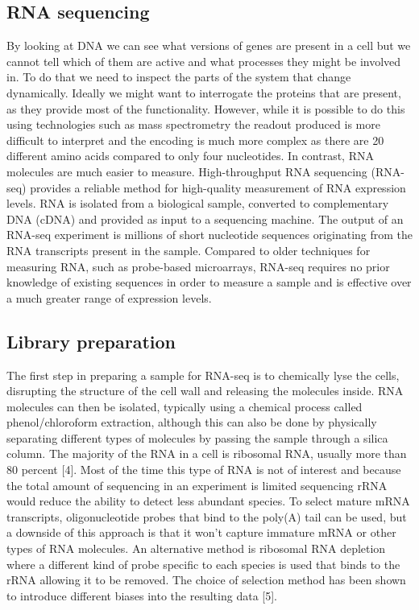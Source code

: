 \documentclass[11pt,a4paper,titlepage,twoside,openright]{style/unimelbthesis}
\theoremstyle{definition}
\theoremstyle{definition}
\theoremstyle{definition}
\theoremstyle{remark}
\begin{document}
\begin{mainmatter}
\hypertarget{intro-RNAseq}{%
\section{RNA sequencing}\label{intro-RNAseq}}

By looking at DNA we can see what versions of genes are present in a cell but we cannot tell which of them are active and what processes they might be involved in. To do that we need to inspect the parts of the system that change dynamically. Ideally we might want to interrogate the proteins that are present, as they provide most of the functionality. However, while it is possible to do this using technologies such as mass spectrometry the readout produced is more difficult to interpret and the encoding is much more complex as there are 20 different amino acids compared to only four nucleotides. In contrast, RNA molecules are much easier to measure. High-throughput RNA sequencing (RNA-seq) provides a reliable method for high-quality measurement of RNA expression levels. RNA is isolated from a biological sample, converted to complementary DNA (cDNA) and provided as input to a sequencing machine. The output of an RNA-seq experiment is millions of short nucleotide sequences originating from the RNA transcripts present in the sample. Compared to older techniques for measuring RNA, such as probe-based microarrays, RNA-seq requires no prior knowledge of existing sequences in order to measure a sample and is effective over a much greater range of expression levels.

\hypertarget{library-preparation}{%
\subsection{Library preparation}\label{library-preparation}}

The first step in preparing a sample for RNA-seq is to chemically lyse the cells, disrupting the structure of the cell wall and releasing the molecules inside. RNA molecules can then be isolated, typically using a chemical process called phenol/chloroform extraction, although this can also be done by physically separating different types of molecules by passing the sample through a silica column. The majority of the RNA in a cell is ribosomal RNA, usually more than 80 percent {[}4{]}. Most of the time this type of RNA is not of interest and because the total amount of sequencing in an experiment is limited sequencing rRNA would reduce the ability to detect less abundant species. To select mature mRNA transcripts, oligonucleotide probes that bind to the poly(A) tail can be used, but a downside of this approach is that it won't capture immature mRNA or other types of RNA molecules. An alternative method is ribosomal RNA depletion where a different kind of probe specific to each species is used that binds to the rRNA allowing it to be removed. The choice of selection method has been shown to introduce different biases into the resulting data {[}5{]}.


\end{mainmatter}
\end{document}
